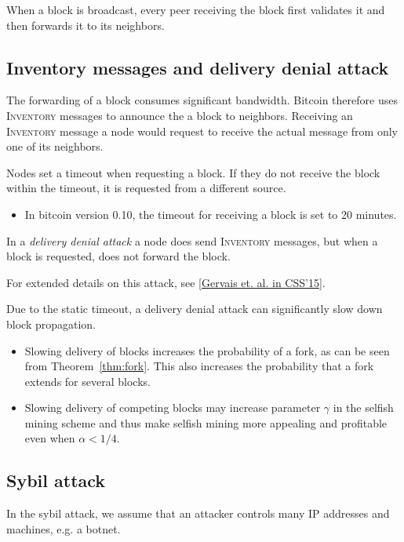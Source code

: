 When a block is broadcast, every peer receiving the block first validates it and then forwards it to its neighbors. 

\subsection{Inventory messages and delivery denial attack}
The forwarding of a block consumes significant bandwidth. 
Bitcoin therefore uses \textsc{Inventory} messages to announce the a block to neighbors. Receiving an \textsc{Inventory} message a node would request to receive the actual message from only one of its neighbors. 

Nodes set a timeout when requesting a block. If they do not receive the block within the timeout, it is requested from a different source.

\begin{itemize}
	\item In bitcoin version 0.10, the timeout for receiving a block is set to 20 minutes.
\end{itemize}

\begin{definition}
In a \emph{delivery denial attack} a node does send \textsc{Inventory} messages, but when a block is requested, does not forward the block.	
\end{definition}

For extended details on this attack, see \href{https://scalingbitcoin.org/zh_HANS/papers/bitcoin-block-transaction-delivery.pdf}{[Gervais et. al. in CSS'15]}.

\begin{note}
	Due to the static timeout, a delivery denial attack can significantly slow down block propagation.
	
	\begin{itemize}
		\item Slowing delivery of blocks increases the probability of a fork, as can be seen from Theorem~\ref{thm:fork}. This also increases the probability that a fork extends for several blocks.
		\item Slowing delivery of competing blocks may increase parameter $\gamma$ in the selfish mining scheme and thus make selfish mining more appealing and profitable even when $\alpha<1/4$.
	\end{itemize}
	
\end{note}

\subsection{Sybil attack}
In the sybil attack, we assume that an attacker controls many IP addresses and machines, e.g. a botnet. 

